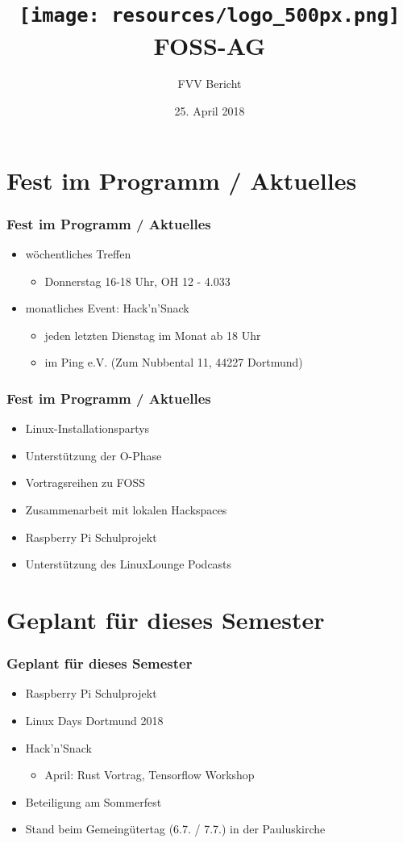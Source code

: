 \documentclass[12pt,utf8]{beamer}
\title{
	\hspace*{8cm}
	\texttt{[image: resources/logo\_500px.png]}
	\newline
	FOSS-AG
}
\subtitle{FVV Bericht}
\institute[FOSS AG]{\textbf{F}ree and \textbf{O}pen \textbf{S}ource \textbf{S}oftware \textbf{AG}}
\date{25. April 2018}
\begin{document}
	\begin{frame}
		\titlepage
	\end{frame}

\section{Fest im Programm / Aktuelles}
	\begin{frame}
		\frametitle{Fest im Programm / Aktuelles}
		\begin{itemize}
			\item wöchentliches Treffen
			\begin{itemize}
				\item Donnerstag 16-18 Uhr, OH 12 - 4.033
			\end{itemize}
			\item monatliches Event: Hack'n'Snack
			\begin{itemize}
				\item jeden letzten Dienstag im Monat ab 18 Uhr
				\item im Ping e.V. (Zum Nubbental 11, 44227 Dortmund)
			\end{itemize}
		\end{itemize}
	\end{frame}

	\begin{frame}
		\frametitle{Fest im Programm / Aktuelles}
		\begin{itemize}
			\item Linux-Installationspartys
			\item Unterstützung der O-Phase
			\item Vortragsreihen zu FOSS
			\item Zusammenarbeit mit lokalen Hackspaces
			\item Raspberry Pi Schulprojekt
			\item Unterstützung des LinuxLounge Podcasts
		\end{itemize}
	\end{frame}

\section{Geplant für dieses Semester}
	\begin{frame}
		\frametitle{Geplant für dieses Semester}
		\begin{itemize}
			\item Raspberry Pi Schulprojekt
			\item Linux Days Dortmund 2018
			\item Hack'n'Snack
				\begin{itemize}
					\item April: Rust Vortrag, Tensorflow Workshop
				\end{itemize}
			\item Beteiligung am Sommerfest
			\item Stand beim Gemeingütertag (6.7. / 7.7.) in der Pauluskirche 
		\end{itemize}
	\end{frame}
\end{document}
